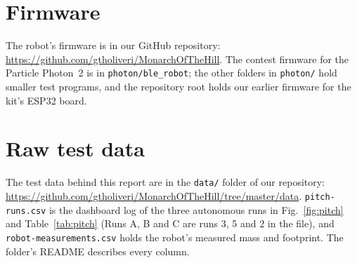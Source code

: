 \clearpage
\appendix
{}

\section{Firmware}
\label{app:firmware}
The robot's firmware is in our GitHub repository: \url{https://github.com/gtholiveri/MonarchOfTheHill}. The contest firmware for the Particle Photon~2 is in \texttt{photon/ble\_robot}; the other folders in \texttt{photon/} hold smaller test programs, and the repository root holds our earlier firmware for the kit's ESP32 board.

\section{Raw test data}
\label{app:data}

The test data behind this report are in the \texttt{data/} folder of our repository: \url{https://github.com/gtholiveri/MonarchOfTheHill/tree/master/data}. \texttt{pitch-runs.csv} is the dashboard log of the three autonomous runs in Fig.~\ref{fig:pitch} and Table~\ref{tab:pitch} (Runs A, B and C are runs 3, 5 and 2 in the file), and \texttt{robot-measurements.csv} holds the robot's measured mass and footprint. The folder's README describes every column.

